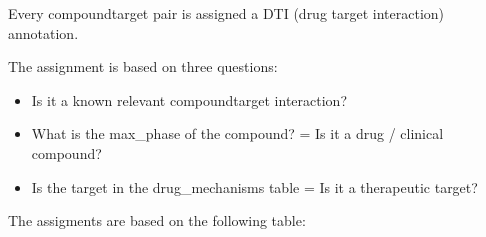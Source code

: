 \documentclass[letterpaper,10pt,english]{sphinxmanual}
\begin{document}
\begin{fulllineitems}
\label{\detokenize{add_dti_annotations:add_dti_annotations.add_dti_annotations}}
\pysigstartsignatures
{}
\pysigstopsignatures
\sphinxAtStartPar
Every compound\sphinxhyphen{}target pair is assigned a DTI (drug target interaction) annotation.

\sphinxAtStartPar
The assignment is based on three questions:
\begin{itemize}
\item {} \begin{description}
\sphinxAtStartPar
Is it a known relevant compound\sphinxhyphen{}target interaction?

\end{description}

\item {} 
\sphinxAtStartPar
What is the max\_phase of the compound? = Is it a drug / clinical compound?

\item {} 
\sphinxAtStartPar
Is the target in the drug\_mechanisms table = Is it a therapeutic target?

\end{itemize}

\sphinxAtStartPar
The assigments are based on the following table:



\end{fulllineitems}
\end{document}
